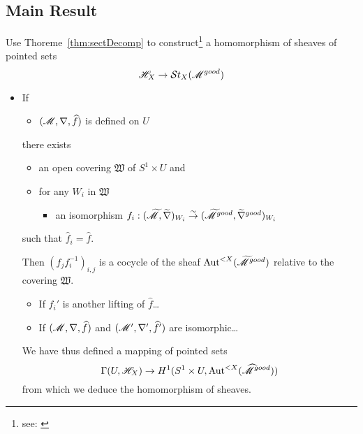 \subsection{Main Result}
Use Thoreme~\ref{thm:sectDecomp} to construct\footnote{see:
\cite[p. 111f]{sabbah2007isomonodromic}} a homomorphism of sheaves of
pointed sets
\[
  \mathscr{H}_X\to\mathcal{S}{}t_X(\mathscr{M}^{good})
\]
\begin{itemize}
  \item If \begin{itemize}
      \item $(\mathscr{M},\nabla,\widehat f)$ is defined on $U$
    \end{itemize}
    there exists
    \begin{itemize}
      \item an open covering $\mathfrak{W}$ of $S^1\times U$ and
      \item for any $W_i$ in $\mathfrak{W}$
        \begin{itemize}
          \item an isomorphism
            $f_i:(\widetilde{\mathscr{M}},\widetilde\nabla)_{W_i}
              \overset{\sim}{\to}
              (\widetilde{\mathscr{M}}^{good},\widetilde\nabla^{good})_{W_i}$
        \end{itemize}
    \end{itemize}
    such that $\hat f_i=\hat f$.

    Then $(f_jf_i^{-1})_{i,j}$ is a cocycle of the sheaf
    $\operatorname{Aut}^{<X}(\widetilde{\mathscr{M}}^{good})$ relative to the covering $\mathfrak{W}$.
    \begin{itemize}
      \item If $f_i'$ is another lifting of $\hat f$\dots
      \item If $(\mathscr{M},\nabla,\widehat f)$ and $(\mathscr{M}',\nabla',\widehat f')$ are
        isomorphic\dots
    \end{itemize}
    We have thus defined a mapping of pointed sets
    \[
      \Gamma(U,\mathscr{H}_X)\to H^1(S^1\times U,\operatorname{Aut}^{<X}(\widehat{\mathscr{M}}^{good}))
    \]
    from which we deduce the homomorphism of sheaves.
\end{itemize}

